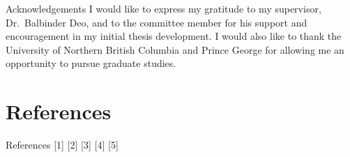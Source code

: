 \documentclass[
  ignorenonframetext,
]{beamer}
\begin{document}
\begin{frame}{Acknowledgements}
\protect\hypertarget{acknowledgements-1}{}
I would like to express my gratitude to my supervisor, Dr.~Balbinder
Deo, and to the committee member for his support and encouragement in my
initial thesis development. I would also like to thank the University of
Northern British Columbia and Prince George for allowing me an
opportunity to pursue graduate studies.
\end{frame}

\hypertarget{references}{%
\section{References}\label{references}}

\begin{frame}{References}
\protect\hypertarget{references-1}{}
{[}1{]} {[}2{]} {[}3{]} {[}4{]} {[}5{]}
\end{frame}
\end{document}
